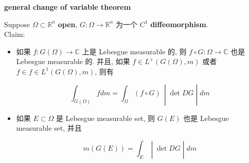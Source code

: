 \documentclass{qlnotes-export}
\begin{document}
\begin{theorem}{\protect{}\label{kn-general-change-of-variable-theorem}{\textbf{general
change of variable theorem}}}

Suppose \(\Omega \subset {\mathbb{R}}^{n}\) \textbf{open}, \(G:\Omega\rightarrow{\mathbb{R}}^{n}\) 为一个 \(C^{1}\) \textbf{diffeomorphism}.\\
Claim:

\begin{itemize}
\item
  如果 \(f:G(\Omega)\rightarrow{\mathbb{C}}\) 上是 Lebesgue measurable 的, 则 \(f \circ G:\Omega\rightarrow{\mathbb{C}}\) 也是 Lebesgue measurable 的. 并且, 如果 \(f \in L^{+}(G(\Omega),m)\) 或者 \(f \in f \in L^{1}(G(\Omega),m)\), 则有

  \[\left. \int_{G(\Omega)}f dm = \int_{\Omega}(f \circ G)\, \middle| \det DG \middle| dm \right.\]
\item
  如果 \(E \subset \Omega\) 是 Lebesgue measurable set, 则 \(G(E)\) 也是 Lebesgue measurable set, 并且

  \[\left. m(G(E)) = \int_{E} \middle| \det DG \middle| dm \right.\]
\end{itemize}

\end{theorem}
\end{document}
